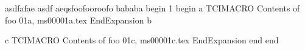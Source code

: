 asdfafae asdf aeqsfoofooroofo bababa
begin
1
begin
a
TCIMACRO
Contents of foo 01a, ms00001a.tex
EndExpansion
b
%

c
TCIMACRO
Contents of foo 01c, ms00001c.tex
EndExpansion
end
end
